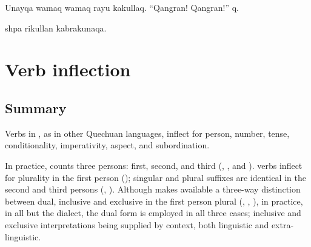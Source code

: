 %
{Unayqa wamaq wamaq rayu kakullaq. ``\textexclamdown{}Qangran! \textexclamdown{}Qangran!'' q.}%
{}%
{}{}%

%
{shpa rikullan kabrakunaqa.}%
{}%
{}{}%

\newpage
\section{Verb inflection}
\subsection{Summary}\label{sec:verbs summary}
Verbs in \SYQ{}, as in other Quechuan languages, inflect for person, number, tense, conditionality, imperativity, aspect, and subordination. 

In practice, \SYQ{} counts three persons: first, second, and third (, , and ). \SYQ{} verbs inflect for plurality in the first person (); singular and plural suffixes are identical in the second and third persons (, ). Although \SYQ{} makes available a three-way distinction between dual, inclusive and exclusive in the first person plural (, , ), in practice, in all but the \CH{} dialect, the dual form is employed in all three cases; inclusive and exclusive interpretations being supplied by context, both linguistic and extra-linguistic. 

